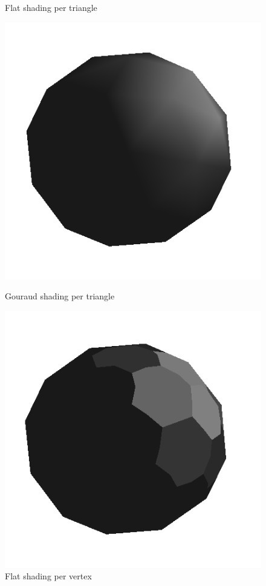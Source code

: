 \begin{figure}[h]
    \centering
    \centering
    \caption{Flat shading per triangle}\label{fig:flat-shading-triangle}
    \endminipage\hfill
    \centering
    \includegraphics[scale=0.5]{images/gouraudshading.png}
    \caption{Gouraud shading per triangle}\label{fig:gouraud-shading}
    \endminipage\hfill
    \centering
    \includegraphics[scale=0.5]{images/extentflatshading.png}
    \caption{Flat shading per vertex}\label{fig:flat-shading-vertex}
    \endminipage
\end{figure}


